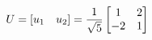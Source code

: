 \documentclass[preview]{standalone}
\begin{document}
\begin{align*}
\special{dvisvgm:raw <g id='unique000'>}U = [u_1 \quad u_2] = \frac{1}{\sqrt{5}} \begin{bmatrix} 1 & 2 \\ -2 & 1 \end{bmatrix}\special{dvisvgm:raw </g>}
\end{align*}
\end{document}
